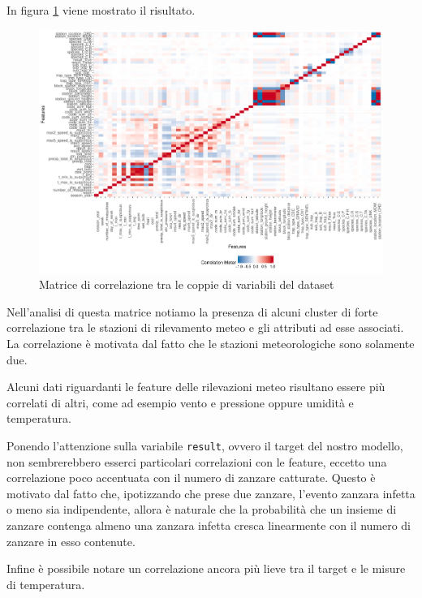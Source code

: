 In figura \ref{fig:plot_correlation} viene mostrato il risultato.

\begin{figure}[htb]
	\centering
	\includegraphics[width=1\columnwidth]{images/ml/plot_correlation}
	\caption{Matrice di correlazione tra le coppie di variabili del dataset}
	\label{fig:plot_correlation}
\end{figure}

Nell'analisi di questa matrice notiamo la presenza di alcuni cluster di forte 
correlazione tra le stazioni di rilevamento meteo e gli attributi ad esse 
associati. La correlazione è motivata dal fatto che le stazioni meteorologiche 
sono solamente due.

Alcuni dati riguardanti le feature delle rilevazioni meteo risultano essere più 
correlati di altri, come ad esempio vento e pressione oppure umidità e 
temperatura.

Ponendo l'attenzione sulla variabile \texttt{result}, ovvero il target del 
nostro modello, non sembrerebbero esserci particolari correlazioni con le 
feature, eccetto una correlazione poco accentuata con il numero di 
zanzare catturate. Questo è motivato dal fatto che, ipotizzando che prese due 
zanzare, l'evento zanzara infetta o meno sia indipendente, allora è naturale 
che la probabilità che un insieme di zanzare contenga almeno una zanzara 
infetta cresca linearmente con il numero di zanzare in esso contenute.

Infine è possibile notare un correlazione ancora più lieve tra il target e le 
misure di temperatura. 
